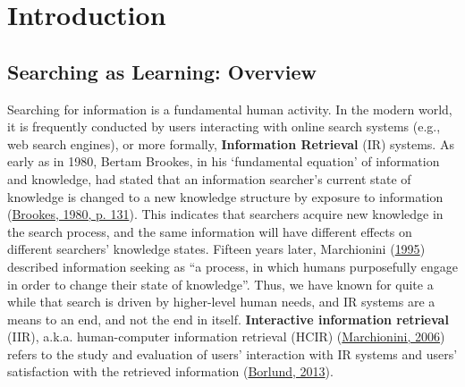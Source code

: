 \documentclass[letterpaper, nobind]{templates/ociamthesis}
\begin{document}
\begin{romanpages}
\flushbottom

\tableofcontents

\listoffigures
	\mtcaddchapter

\listoftables
  \mtcaddchapter

\end{romanpages}

\flushbottom

\hypertarget{introduction}{%
\chapter{Introduction}\label{introduction}}

\hypertarget{sec-intro-overview}{%
\section{Searching as Learning: Overview}\label{sec-intro-overview}}

Searching for information is a fundamental human activity. In the modern world, it is frequently conducted by users interacting with online search systems (e.g., web search engines), or more formally, \textbf{Information Retrieval} (IR) systems.
As early as in 1980, Bertam Brookes, in his `fundamental equation' of information and knowledge, had stated that an information searcher's current state of knowledge is changed to a new knowledge structure by exposure to information (\protect\hyperlink{ref-brookes1980foundations}{Brookes, 1980, p. 131}).
This indicates that searchers acquire new knowledge in the search process, and the same information will have different effects on different searchers' knowledge states.
Fifteen years later, Marchionini (\protect\hyperlink{ref-marchionini1995information}{1995}) described information seeking as ``a process, in which humans purposefully engage in order to change
their state of knowledge''.
Thus, we have known for quite a while that search is driven by higher-level human needs, and IR systems are a means to an end, and not the end in itself.
\textbf{Interactive information retrieval} (IIR), a.k.a. human-computer information retrieval (HCIR) (\protect\hyperlink{ref-marchionini2006toward}{Marchionini, 2006}) refers to the study and evaluation of users' interaction with IR systems and users' satisfaction with the retrieved information (\protect\hyperlink{ref-borlund2013interactive}{Borlund, 2013}).
\end{document}
